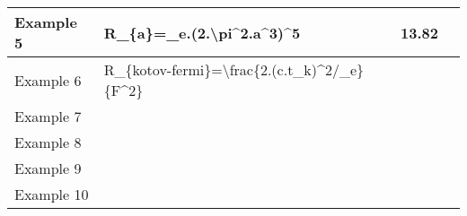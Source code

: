 \documentclass{article}
\begin{document}
\begin{table}[]
\begin{tabular}{|l|l|l|l|}
Example 5   & R\_\{a\}=\_e.(2.\textbackslash{}pi\textasciicircum{}2.a\textasciicircum{}3)\textasciicircum{}5                                              & \multicolumn{1}{r|}{13.82}                                                                                                            &                                                                                               \\ \hline
Example 6   & R\_\{kotov-fermi\}=\textbackslash{}frac\{2.(c.t\_k)\textasciicircum{}2/\_e\}\{F\textasciicircum{}2\}                                        &                                                                                                                                       &                                                                                               \\ \hline
Example 7   &                                                                                                                                             &                                                                                                                                       &                                                                                               \\ \hline
Example 8   &                                                                                                                                             &                                                                                                                                       &                                                                                               \\ \hline
Example 9   &                                                                                                                                             &                                                                                                                                       &                                                                                               \\ \hline
Example 10  &                                                                                                                                             &                                                                                                                                       &                                                                                               \\ \hline

\end{tabular}
\end{table}
\end{document}
